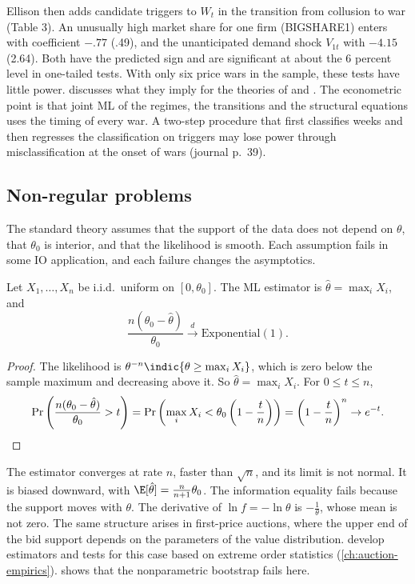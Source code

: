 Ellison then adds candidate triggers to $W_t$ in the transition from collusion to war (Table 3). An unusually high market
share for one firm (BIGSHARE1) enters with coefficient $-.77$ (.49), and the unanticipated demand shock $V_{1t}$ with $-4.15$
(2.64). Both have the predicted sign and are significant at about the 6 percent level in one-tailed tests. With only six
price wars in the sample, these tests have little power.  discusses what they imply for the
theories of \citet{GreenPorter1984} and \citet{RotembergSaloner1986}. The econometric point is that joint ML of the regimes,
the transitions and the structural equations uses the timing of every war. A two-step procedure that first classifies weeks
and then regresses the classification on triggers may lose power through misclassification at the onset of wars
(journal p.~39).

\subsection{Non-regular problems}\label{sec:A-mle-nonregular}

The standard theory assumes that the support of the data does not depend on $\theta$, that $\theta_0$ is interior, and that
the likelihood is smooth. Each assumption fails in some IO application, and each failure changes the asymptotics.

\begin{proposition}\label{prop:A-uniform-mle}
Let $X_1, \dots, X_n$ be i.i.d.\ uniform on $[0, \theta_0]$. The ML estimator is $\hat\theta = \max_iX_i$, and
\begin{equation*}
  \frac{n(\theta_0 - \hat\theta)}{\theta_0} \xrightarrow{d} \mathrm{Exponential}(1).
\end{equation*}
\end{proposition}

\begin{proof}
The likelihood is $\theta^{-n}\indic\{\theta \ge \max_iX_i\}$, which is zero below the sample maximum and decreasing above it.
So $\hat\theta = \max_iX_i$. For $0 \le t \le n$,
\begin{equation*}
  \Pr\left(\frac{n(\theta_0 - \hat\theta)}{\theta_0} > t\right) = \Pr\left(\max_iX_i < \theta_0\left(1 - \frac{t}{n}\right)\right)
  = \left(1 - \frac{t}{n}\right)^n \to e^{-t}. \qedhere
\end{equation*}
\end{proof}

The estimator converges at rate $n$, faster than $\sqrt{n}$, and its limit is not normal. It is biased downward, with
$\E[\hat\theta] = \frac{n}{n + 1}\theta_0$. The information equality fails because the support moves with $\theta$. The
derivative of $\ln f = -\ln\theta$ is $-\frac{1}{\theta}$, whose mean is not zero. The same structure arises in first-price
auctions, where the upper end of the bid support depends on the parameters of the value distribution.
\citet{DonaldPaarsch1996} develop estimators and tests for this case based on extreme order statistics
(\cref{ch:auction-empirics}).  shows that the nonparametric bootstrap fails here.

